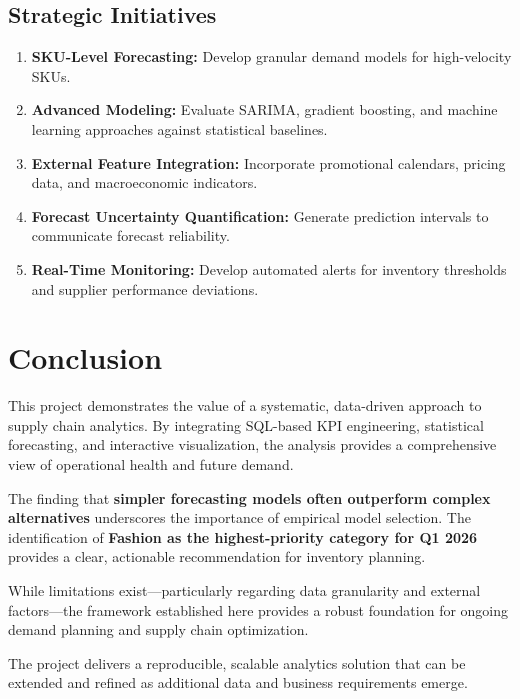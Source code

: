 \documentclass[11pt,a4paper]{article}
\begin{document}
\subsection{Strategic Initiatives}

\begin{enumerate}[leftmargin=1.5em]
    \item \textbf{SKU-Level Forecasting:} Develop granular demand models for high-velocity SKUs.
    \item \textbf{Advanced Modeling:} Evaluate SARIMA, gradient boosting, and machine learning approaches against statistical baselines.
    \item \textbf{External Feature Integration:} Incorporate promotional calendars, pricing data, and macroeconomic indicators.
    \item \textbf{Forecast Uncertainty Quantification:} Generate prediction intervals to communicate forecast reliability.
    \item \textbf{Real-Time Monitoring:} Develop automated alerts for inventory thresholds and supplier performance deviations.
\end{enumerate}

\section{Conclusion}

This project demonstrates the value of a systematic, data-driven approach to supply chain analytics. By integrating SQL-based KPI engineering, statistical forecasting, and interactive visualization, the analysis provides a comprehensive view of operational health and future demand.

The finding that \textbf{simpler forecasting models often outperform complex alternatives} underscores the importance of empirical model selection. The identification of \textbf{Fashion as the highest-priority category for Q1 2026} provides a clear, actionable recommendation for inventory planning.

While limitations exist---particularly regarding data granularity and external factors---the framework established here provides a robust foundation for ongoing demand planning and supply chain optimization.

\begin{keyfinding}
The project delivers a reproducible, scalable analytics solution that can be extended and refined as additional data and business requirements emerge.
\end{keyfinding}
\end{document}
